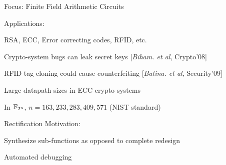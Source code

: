 



\begin{frame}{\large Focus: Finite Field Arithmetic Circuits}
\bi
	\item Applications:
	\bi
		\item RSA, ECC, Error correcting codes, RFID, etc.
		\bi
			\item Crypto-system bugs can leak secret keys [{\it Biham. et al}, Crypto'08]
			\item RFID tag cloning could cause counterfeiting [{\it Batina. et al}, Security'09]
		\ei
		\item Large datapath sizes in ECC crypto systems 
		\bi
			\item In ${\mathbb{F}}_{2^n}$, $n=163, 233, 283, 409, 571$ (NIST standard)
		\ei
	\ei
	\pause
	\vspace{0.1in}
	\item Rectification Motivation: 
	\bi
		\item Synthesize sub-functions as opposed to complete redesign
		\item Automated debugging
	\ei
\ei
\end{frame}

